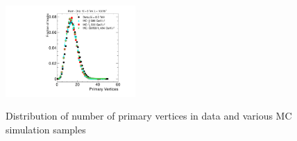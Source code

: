 \begin{figure}
  \begin{center}
      \includegraphics[clip=true, trim=0.0cm 0cm 3.0cm 0cm, width=0.44\textwidth]{figures/muonly/Selection_Comp_Signal_8TeV_PV_BS} \\
  \end{center}
        \caption[Distribution of number of primary vertices in data and various MC simulation samples]
{Distribution of number of primary vertices in data and various MC simulation samples
        }
      \label{fig:PV}
\end{figure}